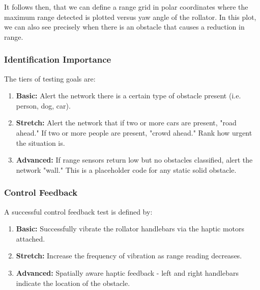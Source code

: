 
\noindent It follows then, that we can define a range grid in polar coordinates where the maximum range detected is plotted versus yaw angle of the rollator. In this plot, we can also see precisely when there is an obstacle that causes a reduction in range.\\

\subsubsection{Identification Importance}
The tiers of testing goals are:
\begin{enumerate}
	\item \textbf{Basic:} Alert the network there is a certain type of obstacle present (i.e. person, dog, car).
	\item \textbf{Stretch:} Alert the network that if two or more cars are present, "road ahead." If two or more people are present, "crowd ahead." Rank how urgent the situation is.
	\item \textbf{Advanced:} If range sensors return low but no obstacles classified, alert the network "wall." This is a placeholder code for any static solid obstacle.
\end{enumerate}

\subsubsection{Control Feedback}
A successful control feedback test is defined by:
\begin{enumerate}
	\item \textbf{Basic:} Successfully vibrate the rollator handlebars via the haptic motors attached.
	\item \textbf{Stretch:} Increase the frequency of vibration as range reading decreases.
	\item \textbf{Advanced:} Spatially aware haptic feedback - left and right handlebars indicate the location of the obstacle.
\end{enumerate}

